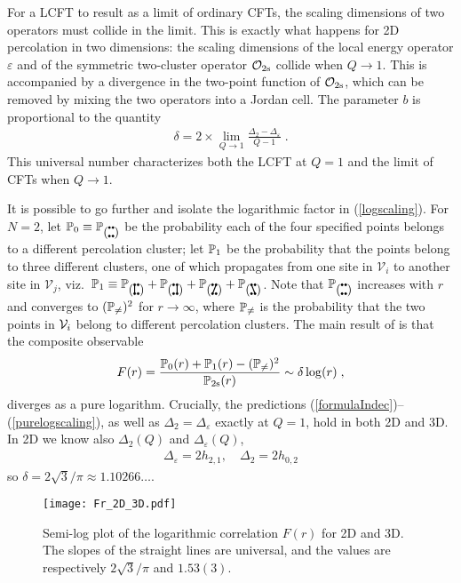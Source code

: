\documentclass[aps,prl,twocolumn,showpacs,superscriptaddress,groupedaddress]{revtex4}  %
\newcommand{\PPzero}{
\left(
\begin{tikzpicture}[baseline=1pt]
 \draw [fill] (0,0) circle(0.2ex);
 \draw [fill] (0.1,0) circle(0.2ex);
 \draw [fill] (0,0.25) circle(0.2ex);
 \draw [fill] (0.1,0.25) circle(0.2ex);
\end{tikzpicture}
\right)}
\newcommand{\PPca}{
\left(
\begin{tikzpicture}[baseline=1pt]
 \draw [fill] (0,0) circle(0.2ex);
 \draw [fill] (0.1,0) circle(0.2ex);
 \draw [fill] (0,0.25) circle(0.2ex);
 \draw [fill] (0.1,0.25) circle(0.2ex);
 \draw [thick] (0,0)--(0,0.25);
\end{tikzpicture}
\right)}
\newcommand{\PPcb}{
\left(
\begin{tikzpicture}[baseline=1pt]
 \draw [fill] (0,0) circle(0.2ex);
 \draw [fill] (0.1,0) circle(0.2ex);
 \draw [fill] (0,0.25) circle(0.2ex);
 \draw [fill] (0.1,0.25) circle(0.2ex);
 \draw [thick] (0.1,0)--(0.1,0.25);
\end{tikzpicture}
\right)}
\newcommand{\PPcc}{
\left(
\begin{tikzpicture}[baseline=1pt]
 \draw [fill] (0,0) circle(0.2ex);
 \draw [fill] (0.1,0) circle(0.2ex);
 \draw [fill] (0,0.25) circle(0.2ex);
 \draw [fill] (0.1,0.25) circle(0.2ex);
 \draw [thick] (0,0)--(0.1,0.25);
\end{tikzpicture}
\right)}
\newcommand{\PPcd}{
\left(
\begin{tikzpicture}[baseline=1pt]
 \draw [fill] (0,0) circle(0.2ex);
 \draw [fill] (0.1,0) circle(0.2ex);
 \draw [fill] (0,0.25) circle(0.2ex);
 \draw [fill] (0.1,0.25) circle(0.2ex);
 \draw [thick] (0,0.25)--(0.1,0);
\end{tikzpicture}
\right)}
\begin{document}
For a LCFT to result as a limit of ordinary CFTs, the scaling dimensions of two operators must collide in the limit.
This is exactly what happens for 2D percolation in two dimensions: the scaling dimensions of the local energy operator $\varepsilon$
and of the symmetric two-cluster operator $\mathcal{O}_{2{\rm s}}$ collide when $Q \to 1$. This is accompanied by
a divergence in the two-point function of $\mathcal{O}_{2{\rm s}}$, which can be removed by mixing the two operators
into a Jordan cell. The parameter $b$ is proportional to the quantity
\begin{eqnarray}
 \delta =2\times\lim_{Q\rightarrow1}\frac{\Delta_2-\Delta_{\varepsilon}}{Q-1} \;.
\label{formulaIndec}
\end{eqnarray}
This universal number characterizes both the LCFT at $Q=1$ and the limit of CFTs when $Q\to 1$.

It is possible to go further and isolate the logarithmic factor in (\ref{logscaling}).
    For $N=2$, let $\bP_0 \equiv \bP_{\PPzero}$ be the probability each of the four specified points belongs to a different percolation cluster;
let $ \mathbb P_1$ be the probability that the points belong to three different clusters, one of which propagates from one site in ${\mathcal V}_i$
    to another site in $ {\mathcal V}_j$, viz.\ $ \bP_1 \equiv \bP_{\PPca} + \bP_{\PPcb}+\bP_{\PPcc}+\bP_{\PPcd} $.
    Note that $\bP_{\PPzero}$ increases with $r$ and converges to $(\mathbb P_{\neq})^2$ for $r \rightarrow \infty$, where $\mathbb P_{\neq}$ is the
probability that the two points in ${\cal V}_i$ belong to different percolation clusters. 
The main result of \cite{VJS} is that the composite observable
\begin{equation} 
F(r)=\frac{  \mathbb P_0(r) + \mathbb P_1(r) - (\mathbb P_{\neq})^2}{\mathbb P_{2{\rm s}}(r)} \sim \delta \log (r)\; ,
\label{purelogscaling}
\end{equation}
diverges as a pure logarithm. Crucially, the predictions (\ref{formulaIndec})--(\ref{purelogscaling}), as well as
$\Delta_2 = \Delta_{\varepsilon}$ exactly at $Q=1$, hold in both 2D and 3D. In 2D we know also
$\Delta_2(Q)$ and $\Delta_{\varepsilon}(Q)$,
\begin{eqnarray}
\Delta_{\varepsilon}=2h_{2,1},\quad\Delta_2=2h_{0,2}
\end{eqnarray}
so $\delta = 2 \sqrt{3}/\pi\approx1.10266\ldots$.

\begin{figure}
\begin{center}
\texttt{[image: Fr\_2D\_3D.pdf]}
    \caption{Semi-log plot of the logarithmic correlation $F(r)$ for 2D and 3D. 
    The slopes of the straight lines are universal, and the values are respectively $2\sqrt{3}/\pi$ and $1.53(3)$.
    }
\label {fig02}
\end{center}
\end{figure}
\end{document}
